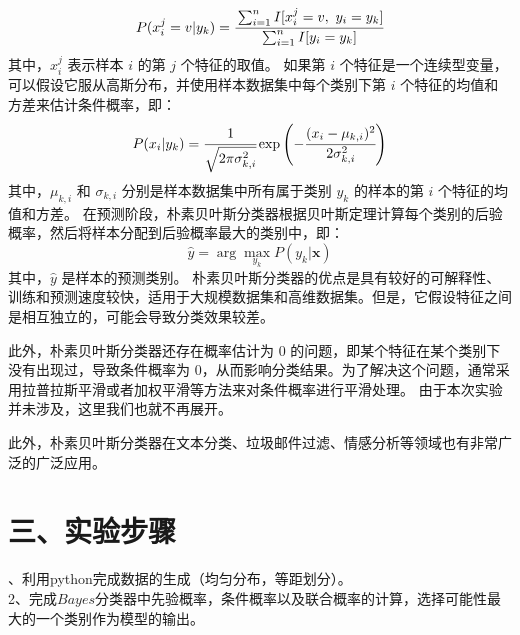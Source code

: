 \documentclass{article}
\begin{document}
$$P(x_i^j=v|y_k)=\cfrac{\sum_{i=1}^n I[x_{i}^j=v,\ y_i=y_k]}{\sum_{i=1}^n I[y_i=y_k]}$$
其中，$x_{i}^j$ 表示样本 $i$ 的第 $j$ 个特征的取值。
如果第 $i$ 个特征是一个连续型变量，可以假设它服从高斯分布，并使用样本数据集中每个类别下第 $i$ 个特征的均值和方差来估计条件概率，即：
$$P(x_i|y_k)=\cfrac{1}{\sqrt{2\pi\sigma_{k,i}^2}}\exp\left(-\cfrac{(x_i-\mu_{k,i})^2}{2\sigma_{k,i}^2}\right)$$
其中，$\mu_{k,i}$ 和 $\sigma_{k,i}$ 分别是样本数据集中所有属于类别 $y_k$ 的样本的第 $i$ 个特征的均值和方差。
在预测阶段，朴素贝叶斯分类器根据贝叶斯定理计算每个类别的后验概率，然后将样本分配到后验概率最大的类别中，即：
$$\hat{y}=\arg\max_{y_k} P(y_k|\boldsymbol{x})$$
其中，$\hat{y}$ 是样本的预测类别。
朴素贝叶斯分类器的优点是具有较好的可解释性、训练和预测速度较快，适用于大规模数据集和高维数据集。但是，它假设特征之间是相互独立的，可能会导致分类效果较差。


此外，朴素贝叶斯分类器还存在概率估计为 $0$ 的问题，即某个特征在某个类别下没有出现过，导致条件概率为 $0$，从而影响分类结果。为了解决这个问题，通常采用拉普拉斯平滑或者加权平滑等方法来对条件概率进行平滑处理。
由于本次实验并未涉及，这里我们也就不再展开。


此外，朴素贝叶斯分类器在文本分类、垃圾邮件过滤、情感分析等领域也有非常广泛的广泛应用。


\section*{\LARGE 三、实验步骤}、利用python完成数据的生成（均匀分布，等距划分）。\\
2、完成$Bayes$分类器中先验概率，条件概率以及联合概率的计算，选择可能性最大的一个类别作为模型的输出。\\
\end{document}
